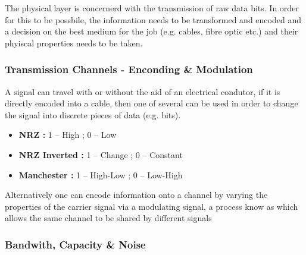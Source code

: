 	\par{The physical layer is concernerd with the transmission of raw data bits. In order for this to be possbile, the information needs to be transformed and encoded and a decision on the best medium for the job (e.g. cables, fibre optic etc.) and their phyiscal properties needs to be taken.}

	\subsubsection{Transmission Channels - Enconding \& Modulation}



	\par{A signal can travel with or without the aid of an electrical condutor, if it is directly encoded into a cable, then one of several  can be used in order to change the signal into discrete pieces of data (e.g. bits).}

		\begin{itemize}
			\setlength\itemsep{0.5em}
			\mymarginpar{High $\approx [3,5]v$ , and Low $\approx [0,3)$}
			\item\textbf{NRZ : }{1 -- High ; 0 -- Low}
			\item\textbf{NRZ Inverted : }{1 -- Change ; 0 -- Constant}
			\item\textbf{Manchester : }{1 -- High-Low ; 0 -- Low-High}
		\end{itemize}
		


	\par{Alternatively one can encode information onto a channel by varying the properties of the carrier signal via a modulating signal, a process know as  which allows the same channel to be shared by different signals}


	\subsubsection{Bandwith, Capacity \& Noise}

